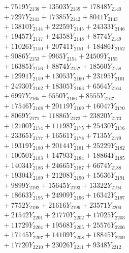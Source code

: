\documentclass[a4paper,10pt]{article}
\begin{document}
{\begin{align}
&\;  + 7519 Y_{2138} + 13503 Y_{2139} + 17848 Y_{2140} \\[0.3ex]
&\;  + 7297 Y_{2141} + 17385 Y_{2142} + 8041 Y_{2143} \\[0.3ex]
&\;  + 13810 Y_{2144} + 22259 Y_{2145} + 24333 Y_{2146} \\[0.3ex]
&\;  + 19457 Y_{2147} + 24358 Y_{2148} + 8774 Y_{2149} \\[0.3ex]
&\;  + 11026 Y_{2150} + 20741 Y_{2151} + 18486 Y_{2152} \\[0.3ex]
&\;  + 9086 Y_{2153} + 9965 Y_{2154} + 24509 Y_{2155} \\[0.3ex]
&\;  + 16385 Y_{2156} + 8874 Y_{2157} + 18560 Y_{2158} \\[0.5ex]\allowbreak
&\;  + 12991 Y_{2159} + 13053 Y_{2160} + 23195 Y_{2161} \\[0.3ex]
&\;  + 24930 Y_{2162} + 18305 Y_{2163} + 6564 Y_{2164} \\[0.3ex]
&\;  + 6997 Y_{2165} + 6550 Y_{2166} + 8555 Y_{2167} \\[0.3ex]
&\;  + 17546 Y_{2168} + 20119 Y_{2169} + 16047 Y_{2170} \\[0.3ex]
&\;  + 8069 Y_{2171} + 11886 Y_{2172} + 23820 Y_{2173} \\[0.3ex]
&\;  + 12100 Y_{2174} + 11198 Y_{2175} + 25430 Y_{2176} \\[0.3ex]
&\;  + 23365 Y_{2177} + 16561 Y_{2178} + 7135 Y_{2179} \\[0.3ex]
&\;  + 19319 Y_{2180} + 20144 Y_{2181} + 25229 Y_{2182} \\[0.3ex]
&\;  + 10050 Y_{2183} + 14793 Y_{2184} + 18864 Y_{2185} \\[0.3ex]
&\;  + 14034 Y_{2186} + 24665 Y_{2187} + 6674 Y_{2188} \\[0.5ex]\allowbreak
&\;  + 19304 Y_{2189} + 21208 Y_{2190} + 15636 Y_{2191} \\[0.3ex]
&\;  + 9899 Y_{2192} + 15645 Y_{2193} + 13322 Y_{2194} \\[0.3ex]
&\;  + 18663 Y_{2195} + 24909 Y_{2196} + 16342 Y_{2197} \\[0.3ex]
&\;  + 7752 Y_{2198} + 21616 Y_{2199} + 23571 Y_{2200} \\[0.3ex]
&\;  + 21542 Y_{2201} + 21770 Y_{2202} + 17025 Y_{2203} \\[0.3ex]
&\;  + 11729 Y_{2204} + 19568 Y_{2205} + 25576 Y_{2206} \\[0.3ex]
&\;  + 17145 Y_{2207} + 14109 Y_{2208} + 18845 Y_{2209} \\[0.3ex]
&\;  + 17720 Y_{2210} + 23026 Y_{2211} + 9348 Y_{2212} \\[0.3ex]

\end{align}}
\end{document}

